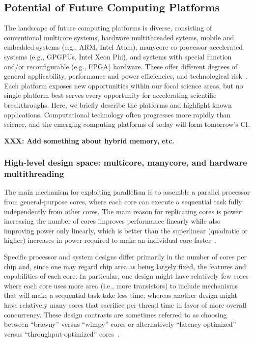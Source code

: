 \subsection{Potential of Future Computing Platforms}
The landscape of future computing platforms is diverse, consisting of conventional multicore systems, hardware multithreaded sytems, mobile and embedded systems (e.g., ARM, Intel Atom), manycore co-processor accelerated systems (e.g., GPGPUs, Intel Xeon Phi), and systems with special function and/or reconfigurable (e.g., FPGA) hardware.
These offer different degrees of general applicability,
performance and power efficiencies, and technological risk~\cite{Choi:2014bb}.
Each platform exposes new
opportunities within our focal science areas, but no single platform best serves every opportunity
for accelerating scientific breakthroughs. 
Here, we briefly describe the platforms and highlight
known applications. Computational technology often progresses more rapidly than science, and the
emerging computing platforms of today will form tomorrow's CI.

\textbf{XXX: Add something about hybrid memory, etc.}

\subsubsection{High-level design space: multicore, manycore, and hardware multithreading}
The main mechanism for exploiting parallelism is to assemble a parallel processor from general-purpose cores, where each core can execute a sequential task fully independently from other cores.
The main reason for replicating cores is power:
increasing the number of cores improves performance linearly while also improving power only linearly, which is better than the superlinear (quadratic or higher) increases in power required to make an individual core faster~\cite{patterson:2010:spectrum}.

Specific processor and system designs differ primarily in the number of cores per chip and, since one may regard chip area as being largely fixed, the features and capabilities of each core.
In particular, one design might have relatively few cores where each core uses more area (i.e., more transistors) to include mechanisms that will make a sequential task take less time;
whereas another design might have relatively many cores that sacrifice per-thread time in favor of more overall concurrency.
These design contrasts are sometimes referred to as choosing between ``brawny'' versus ``wimpy'' cores or alternatively ``latency-optimized'' versus ``throughput-optimized'' cores~\cite{Holzle2010,Garland2010b}.

